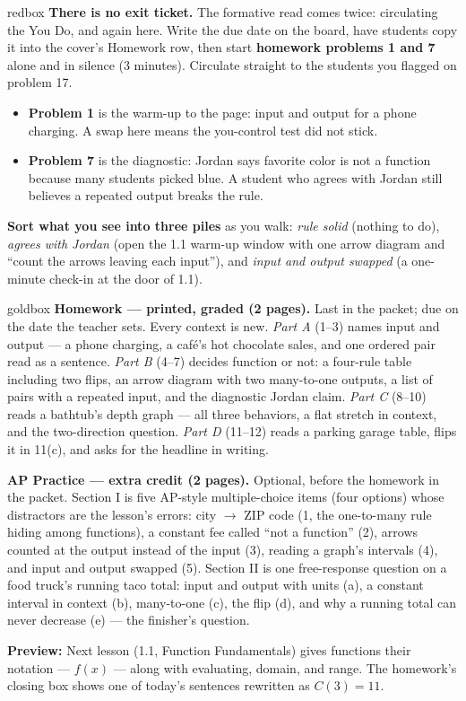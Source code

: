 \documentclass[10pt]{article}
\begin{document}
\begin{skillbox}{redbox}
\textbf{There is no exit ticket.} The formative read comes twice: circulating the
You Do, and again here. Write the due date on the board, have students copy it into
the cover's Homework row, then start \textbf{homework problems 1 and 7} alone and in
silence (3 minutes). Circulate straight to the students you flagged on problem 17.
\begin{itemize}[itemsep=2pt]
  \item \textbf{Problem 1} is the warm-up to the page: input and output for a phone
        charging. A swap here means the you-control test did not stick.
  \item \textbf{Problem 7} is the diagnostic: Jordan says favorite color is not a
        function because many students picked blue. A student who agrees with
        Jordan still believes a repeated output breaks the rule.
\end{itemize}
\textbf{Sort what you see into three piles} as you walk: \textit{rule solid}
(nothing to do), \textit{agrees with Jordan} (open the 1.1 warm-up window with one
arrow diagram and ``count the arrows leaving each input''), and \textit{input and
output swapped} (a one-minute check-in at the door of 1.1).
\end{skillbox}

\begin{skillbox}{goldbox}
\textbf{Homework --- printed, graded (2 pages).} Last in the packet; due on the date
the teacher sets. Every context is new. \textit{Part A} (1--3) names input and
output --- a phone charging, a café's hot chocolate sales, and one ordered pair read
as a sentence. \textit{Part B} (4--7) decides function or not: a four-rule table
including two flips, an arrow diagram with two many-to-one outputs, a list of pairs
with a repeated input, and the diagnostic Jordan claim. \textit{Part C} (8--10)
reads a bathtub's depth graph --- all three behaviors, a flat stretch in context,
and the two-direction question. \textit{Part D} (11--12) reads a parking garage
table, flips it in 11(c), and asks for the headline in writing.

\textbf{AP Practice --- extra credit (2 pages).} Optional, before the homework in the
packet. Section I is five AP-style multiple-choice items (four options) whose
distractors are the lesson's errors: city $\to$ ZIP code (1, the one-to-many rule
hiding among functions), a constant fee called ``not a function'' (2), arrows counted
at the output instead of the input (3), reading a graph's intervals (4), and input
and output swapped (5). Section II is one free-response question on a food truck's
running taco total: input and output with units (a), a constant interval in context
(b), many-to-one (c), the flip (d), and why a running total can never decrease (e)
--- the finisher's question.

\textbf{Preview:} Next lesson (1.1, Function Fundamentals) gives functions their
notation --- $f(x)$ --- along with evaluating, domain, and range. The homework's
closing box shows one of today's sentences rewritten as $C(3) = 11$.
\end{skillbox}
\end{document}
